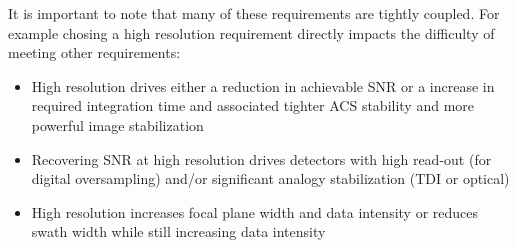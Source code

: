 \documentclass[10pt,journal]{IEEEtran}  %
\begin{document}
\begin{table}[h!t]
\centering
\caption{System Performance Drivers}
\label{table:drivers}
\end{table}

It is important to note that many of these requirements are tightly coupled.  For example chosing a high resolution requirement directly impacts the difficulty of meeting other requirements:

\begin{itemize}
\item High resolution drives either a reduction in achievable SNR or a increase in required integration time and associated tighter ACS stability and more powerful image stabilization
\item Recovering SNR at high resolution drives detectors with high read-out (for digital oversampling) and/or significant analogy stabilization (TDI or optical)
\item High resolution increases focal plane width and data intensity or reduces swath width while still increasing data intensity

\end{itemize}
\end{document}
